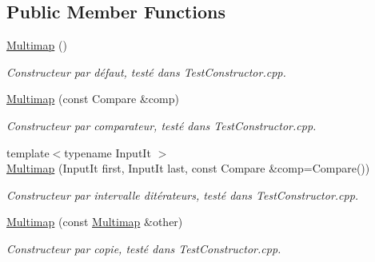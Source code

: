 \subsection*{Public Member Functions}
\begin{DoxyCompactItemize}
\item 
\mbox{\label{classMultimap_acf143964f64ab59e58833b0e677f709e}} 
\hyperlink{classMultimap_acf143964f64ab59e58833b0e677f709e}{Multimap} ()
\begin{DoxyCompactList}\small\item\em Constructeur par défaut, testé dans Test\+Constructor.\+cpp. \end{DoxyCompactList}\item 
\mbox{\label{classMultimap_ad56590d8375c5b731bf6844d0d16822d}} 
\hyperlink{classMultimap_ad56590d8375c5b731bf6844d0d16822d}{Multimap} (const Compare \&comp)
\begin{DoxyCompactList}\small\item\em Constructeur par comparateur, testé dans Test\+Constructor.\+cpp. \end{DoxyCompactList}\item 
\mbox{\label{classMultimap_a9dd081d1a48c837b33e267e2e96aa816}} 
{\footnotesize template$<$typename Input\+It $>$ }\\\hyperlink{classMultimap_a9dd081d1a48c837b33e267e2e96aa816}{Multimap} (Input\+It first, Input\+It last, const Compare \&comp=Compare())
\begin{DoxyCompactList}\small\item\em Constructeur par intervalle d\textquotesingle{}itérateurs, testé dans Test\+Constructor.\+cpp. \end{DoxyCompactList}\item 
\mbox{\label{classMultimap_a905d5cd2b3538dd923ff5102a75f6aab}} 
\hyperlink{classMultimap_a905d5cd2b3538dd923ff5102a75f6aab}{Multimap} (const \hyperlink{classMultimap}{Multimap} \&other)
\begin{DoxyCompactList}\small\item\em Constructeur par copie, testé dans Test\+Constructor.\+cpp. \end{DoxyCompactList}\item 
\mbox{\label{classMultimap_aa3f51fa1d077ccbfa1c748ebf80157c2}} 

\end{DoxyCompactItemize}
